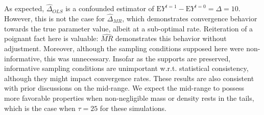 \documentclass[12pt]{amsart}
\theoremstyle{plain}%
\theoremstyle{definition}
\theoremstyle{remark}
\numberwithin{equation}{section}
\begin{document}
As expected, $\hat{\Delta}_{OLS}$ is a confounded estimator of $\text{E}Y^{t=1} - \text{E}Y^{t=0} = \Delta =10$. However, this is not the case for $\hat{\Delta}_{MR}$, which demonstrates convergence behavior towards the true parameter value, albeit at a sub-optimal rate. Reiteration of a poignant fact here is valuable: $\hat{MR}$ demonstrates this behavior without adjustment. Moreover, although the sampling conditions supposed here were non-informative, this was unnecessary. Insofar as the supports are preserved, informative sampling conditions are unimportant w.r.t. statistical consistency, although they might impact convergence rates. These results are also consistent with prior discussions on the mid-range. We expect the mid-range to possess more favorable properties when non-negligible mass or density rests in the tails, which is the case when $\tau = 25$ for these simulations.
\end{document}
